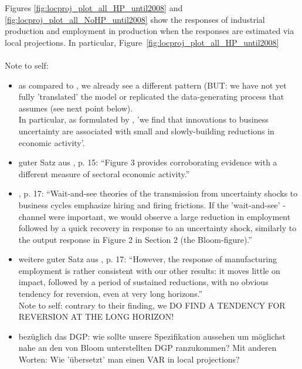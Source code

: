 \documentclass[a4paper,11pt,listof=nochaptergap,oneside,pointednumbers,bibtotoc,bigheadings,liststotoc]{scrbook}
\theoremstyle{mysatz}
\theoremstyle{mydefinition}
\theoremstyle{mybemerkung}
\begin{document}
Figures \ref{fig:locproj_plot_all_HP_until2008} and \ref{fig:locproj_plot_all_NoHP_until2008} show the responses of industrial production and employment in production when the responses are estimated via local projections. In particular, Figure~\ref{fig:locproj_plot_all_HP_until2008} \\
\\
\begingroup
    \fontsize{8pt}{12pt}\selectfont
    Note to self:
\begin{itemize}
	\item as compared to \citet{bloom:09}, we already see a different pattern (BUT: we have not yet fully 'translated' the model or replicated the data-generating process that \citet{bloom:09} assumes (see next point below).\\
	In particular, as formulated by \citet{bachmannetal:13}, 'we find that innovations to business uncertainty are associated with small and slowly-building reductions in economic activity'. 
	\item guter Satz aus \citet{bachmannetal:13}, p. 15: ``Figure 3 provides corroborating evidence with a different measure of sectoral economic activity.'' 
	\item \citet{bachmannetal:13}, p. 17: ``Wait-and-see theories of the transmission from uncertainty shocks to business cycles emphasize hiring and firing frictions. If the 'wait-and-see' - channel were important, we would observe a large reduction in employment followed by a quick recovery in response to an uncertainty shock, similarly to the output response in Figure 2 in Section 2 (the Bloom-figure).''
	\item weitere guter Satz aus \citet{bachmannetal:13}, p. 17: ``However, the response of manufacturing employment is rather consistent with our other results: it moves little on impact, followed by a period of sustained reductions, with no obvious tendency for reversion, even at very long horizons.'' \\
	Note to self: contrary to their finding, we DO FIND A TENDENCY FOR REVERSION AT THE LONG HORIZON!
	\item bezüglich das DGP: wie sollte unsere Spezifikation aussehen um möglichst nahe an den von Bloom unterstellten DGP ranzukommen? Mit anderen Worten: Wie 'übersetzt' man einen VAR in local projections?
\end{itemize}
\endgroup
\end{document}
